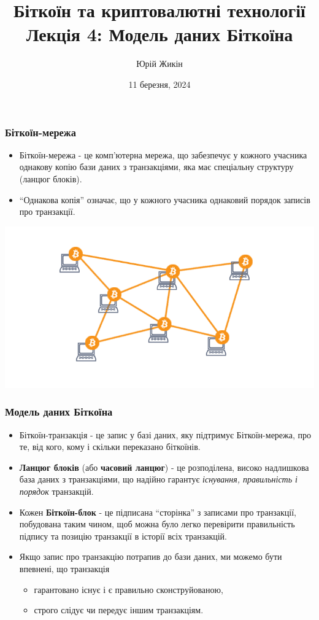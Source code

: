 \documentclass{beamer}
\title{
  Біткоїн та криптовалютні технології \\
  Лекція 4: Модель даних Біткоїна
}
\author{Юрій Жикін}
\date{11 березня, 2024}
\begin{document}
\frame{\titlepage}

\begin{frame}
  \frametitle{Біткоїн-мережа}
  \begin{itemize}
  \item Біткоїн-мережа - це комп'ютерна мережа, що забезпечує у кожного учасника
    однакову копію бази даних з транзакціями, яка має спеціальну структуру
    (ланцюг блоків).
  \item ``Однакова копія'' означає, що у кожного учасника однаковий порядок 
    записів про транзакції.
  \end{itemize}
  \includegraphics[width=\textwidth]{network}
\end{frame}

\begin{frame}
  \frametitle{Модель даних Біткоїна}
  \begin{small}
    \begin{itemize}
    \item Біткоїн-транзакція - це запис у базі даних, яку підтримує
      Біткоїн-мережа, про те, від кого, кому і скільки переказано біткоїнів.
    \item \textbf{Ланцюг блоків} (або \textbf{часовий ланцюг}) - це розподілена,
      високо надлишкова база даних з транзакціями, що надійно гарантує
      \textit{існування, правильність і порядок} транзакцій.
    \item Кожен \textbf{Біткоїн-блок} - це підписана ``сторінка'' з записами про
      транзакції, побудована таким чином, щоб можна було легко перевірити
      правильність підпису та позицію транзакції в історії всіх транзакцій.
    \item Якщо запис про транзакцію потрапив до бази даних, ми можемо бути впевнені,
      що транзакція
      \begin{itemize}
      \item гарантовано існує і є правильно сконструйованою,
      \item строго слідує чи передує іншим транзакціям.
      \end{itemize}
    \end{itemize}
  \end{small}
\end{frame}
\end{document}
